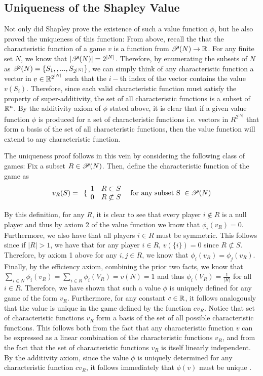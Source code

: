 \subsection{Uniqueness of the Shapley Value}
\label{sec:uniqueness}
Not only did Shapley prove the existence of such a value function $\phi$, but he also proved the uniqueness of this function: From above, recall the that the characteristic function of a game $v$ is a function from $\mathscr{P}(N) \to \mathbb{R}$.  For any finite set $N$, we know that $|\mathscr{P}(N)| = 2^{|N|}$. Therefore, by enumerating the subsets of $N$ as $\mathscr{P}(N) = \{S_1,,...,S_{2^{|N|}}\}$, we can simply think of any characteristic function a vector in $v \in \mathbb{R}^{2^{|N|}}$ such that the $i-$th index of the vector contains the value $v(S_i)$.  Therefore, since each valid characteristic function must satisfy the property of super-additivity, the set of all characteristic functions is a subset of $\mathbb{R}^n$. By the additivity axiom of $\phi$ stated above, it is clear that if a given value function $\phi$ is produced for a set of characteristic functions i.e. vectors in $R^{2^{|N|}}$ that form a basis of the set of all characteristic functions, then the value function will extend to any characteristic function.

The uniqueness proof follows in this vein by considering the following class of games:
Fix a subset $R \in \mathscr{P}(N)$. Then, define the characteristic function of the game as 
$$v_R(S) = 
\begin{array}{cc}
  \{ 
    \begin{array}{cc}
      1 & R \subset S \\
      0 & R \not \subset S 
    \end{array}
\end{array}
\text{ for any subset S } \in \mathscr{P}(N)$$

By this definition, for any $R$, it is clear to see that every player $i \notin R$ is a null player and thus by axiom 2 of the value function we know that $\phi_i(v_R) = 0$.  Furthermore, we also have that all players $i \in R$ must be symmetric. This follows since if $|R| > 1$, we have that for any player $i \in R$, $v(\{i\}) = 0$ since $R \not \subset S$.  Therefore, by axiom 1 above for any $i,j \in R$, we know that $\phi_i(v_R) = \phi_j(v_R)$. Finally, by the efficiency axiom, combining the prior two facts, we know that $\sum_{i \in N}\phi_i(v_R) = \sum_{i \in R}\phi_i(V_R) = v(N) = 1$ and thus $\phi_i(V_R) = \frac{1}{|R|}$ for all $i \in R$. Therefore, we have shown that such a value $\phi$ is uniquely defined for any game of the form $v_R$.  Furthermore, for any constant $c \in \mathbb{R}$, it follows analogously that the value is unique in the game defined by the function $cv_R$.  
Notice that set of characteristic functions $v_R$ form a basis of the set of all possible characteristic functions. This follows both from the fact that any characteristic function $v$ can be expressed as a linear combination of the characteristic functions $v_R$, and from the fact that the set of characteristic functions $v_R$ is itself linearly independent. By the additivity axiom, since the value $\phi$ is uniquely determined for any characteristic function $cv_R$, it follows immediately that $\phi(v)$ must be unique \citep{shapleyValue}.


